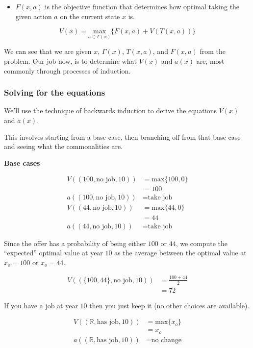\documentclass[a4paper, 12pt]{article}
\begin{document}
\begin{itemize}
  \item $F(x,a)$ is the objective function that determines how
    optimal taking the given action $a$ on the current state $x$
    is.
\end{itemize}

\[
  V(x)=\underset{a \in \Gamma(x)}{\text{max}}\{F(x,a)+V(T(x,a))\}
\]

We can see that we are given $x$, $\Gamma(x)$, $T(x, a)$, and
$F(x, a)$ from the problem. Our job now, is to determine what
$V(x)$ and $a(x)$ are, most commonly through processes of
induction.

\subsubsection{Solving for the equations}

We'll use the technique of backwards induction to derive the
equations $V(x)$ and $a(x)$.

This involves starting from a base case, then branching off from
that base case and seeing what the commonalities are.

\textbf{Base cases}

\[
\begin{aligned}
  V((100, \text{no job}, 10)) &= \text{max}\{100, 0\} \\
                              &= 100 \\
  a((100, \text{no job}, 10)) &= \text{take job} \\
  V((44, \text{no job}, 10)) &= \text{max}\{44, 0\} \\
                             &= 44 \\
  a((44, \text{no job}, 10)) &= \text{take job}
\end{aligned}
\]

Since the offer has a probability of being either $100$ or $44$,
we compute the ``expected'' optimal value at year $10$ as the
average between the optimal value at $x_{o}=100$ or $x_{o}=44$.

\[
\begin{aligned}
  V((\{100, 44\}, \text{no job}, 10)) &= \frac{100+44}{2} \\
                                                &= 72
\end{aligned}
\]

If you have a job at year $10$ then you just keep it (no other
choices are available).

\[
\begin{aligned}
  V((\mathbb{R}, \text{has job}, 10)) &= \text{max}\{x_{o}\} \\
                                                &= x_{o} \\
  a((\mathbb{R}, \text{has job}, 10)) &= \text{no change}
\end{aligned}
\]
\end{document}
